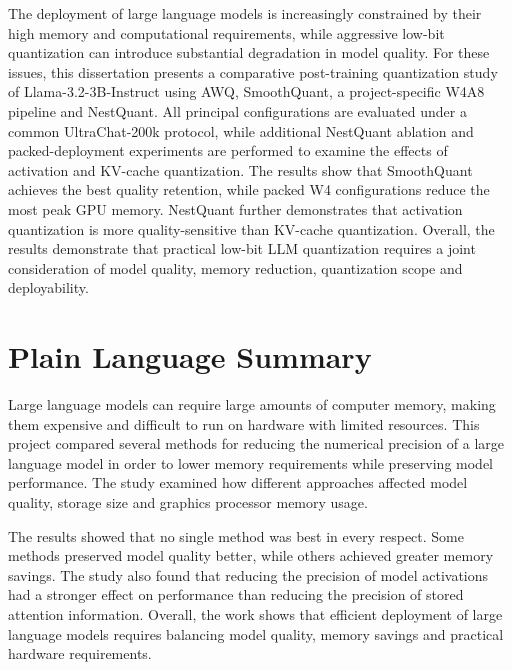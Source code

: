 
The deployment of large language models is increasingly constrained by
their high memory and computational requirements, while aggressive
low-bit quantization can introduce substantial degradation in model
quality.  For these issues, this dissertation presents a comparative
post-training quantization study of Llama-3.2-3B-Instruct using AWQ,
SmoothQuant, a project-specific W4A8 pipeline and NestQuant. All
principal configurations are evaluated under a common UltraChat-200k
protocol, while additional NestQuant ablation and packed-deployment
experiments are performed to examine the effects of activation and
KV-cache quantization. The results show that SmoothQuant achieves the
best quality retention, while packed W4 configurations reduce the most peak GPU memory. NestQuant further demonstrates that activation
quantization is more quality-sensitive than KV-cache quantization. Overall, the results demonstrate
that practical low-bit LLM quantization requires a joint consideration
of model quality, memory reduction, quantization scope and deployability.



\cleardoublepage{}
{}\mtcaddchapter 
\chapter*{Plain Language Summary}
\addtocounter{counter}{-1}


\begin{itemize}
Large language models can require large amounts of computer memory,
making them expensive and difficult to run on hardware with limited
resources. This project compared several methods for reducing the
numerical precision of a large language model in order to lower memory
requirements while preserving model performance. The study examined how
different approaches affected model quality, storage size and graphics
processor memory usage.

The results showed that no single method was best in every respect.
Some methods preserved model quality better, while others achieved
greater memory savings. The study also found that reducing the precision
of model activations had a stronger effect on performance than reducing
the precision of stored attention information. Overall, the work shows
that efficient deployment of large language models requires balancing
model quality, memory savings and practical hardware requirements.
\end{itemize}




